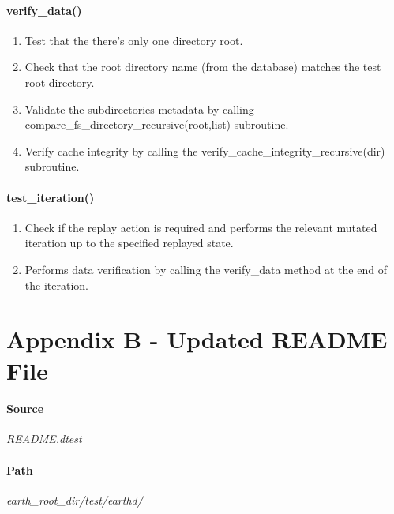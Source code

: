 \documentclass[oneside, 10pt, a4]{article}
\begin{document}
\paragraph{\textbf{\normalsize{verify\_data()}}}
\begin{enumerate}
\item Test that the there's only one directory root.
\item Check that the root directory name (from the database) matches the test root directory.
\item Validate the subdirectories metadata by calling compare\_fs\_directory\_recursive(root,list) subroutine.
\item Verify cache integrity by calling the verify\_cache\_integrity\_recursive(dir) subroutine.
\end{enumerate}

\paragraph{\textbf{\normalsize{test\_iteration()}}}
\begin{enumerate}
\item Check if the replay action is required and performs the relevant mutated iteration up to the specified replayed state.
\item Performs data verification by calling the verify\_data method at the end of the iteration.
\end{enumerate}

\newpage

\section*{Appendix B - Updated README File}

\paragraph{Source} 
\emph{README.dtest}

\paragraph{Path}
\emph{earth\_root\_dir/test/earthd/}
\end{document}

